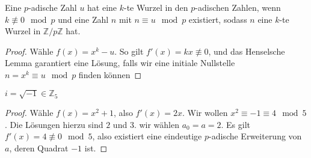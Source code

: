 \documentclass{report}
\newcommand{\bZ}{\mathbb{Z}}
\begin{document}
	\begin{application}
		Eine $p$-adische Zahl $u$ hat eine $k$-te Wurzel in den $p$-adischen Zahlen, wenn $k \not \equiv 0 \mod p$ und eine Zahl $n$ mit $n \equiv u \mod p$ existiert, sodass $n$ eine $k$-te Wurzel in $\bZ / p\bZ$ hat.
	\end{application}
	\begin{proof}
		Wähle $f(x) = x^k - u$. So gilt $f'(x) = kx \not \equiv 0$, und das Henselsche Lemma garantiert eine Lösung, falls wir eine initiale Nullstelle $n = x^k \equiv u \mod p$ finden können
	\end{proof}
	\begin{application}
		$i = \sqrt{-1} \in \bZ_5$
	\end{application}
	\begin{proof}
		Wähle $f(x) = x^2 + 1$, also $f'(x) = 2x$. Wir wollen $x^2 \equiv -1 \equiv 4 \mod 5$. Die Lösungen hierzu sind $2$ und $3$. wir wählen $a_0 = a = 2$. Es gilt $f'(x) = 4 \not\equiv 0 \mod 5$, also existiert eine eindeutige $p$-adische Erweiterung von $a$, deren Quadrat $-1$ ist.
	\end{proof}
	\iffalse
	\section{Eine verallgemeinerte Version}
	Unsere erste Version des Henselschen Lemmas erlaubt uns nicht, Wurzeln mit Vielfachheiten größer als $1$ als die initiale Approximation zu verwenden. Wir beweisen nun eine allgemeinere Version, welche uns außerdem eine Abschätzung des $p$-adischen Abstands zwischen der Approximation und der exakten Lösung gibt:
	\begin{theorem}
		Sei 
		\begin{align*}
			F(x) = \sum_{i = 0}^n c_i x^i
		\end{align*}
		ein Polynom mit Koeffizienten $c_i \in \bZ_p$. Sei $F'(x)$ die Ableitung von $F(x)$, also
		\begin{align*}
			F'(x) = \sum_{i = 0}^{n-1} c_{i+1} x^i
		\end{align*}
		Sei außerdem $a_0 \in \bZ_p$, sodass:
		\begin{align*}
			\abs{F(a_0)}_p < \abs{F'(a_0)}_p^2 
		\end{align*}
		Dann existiert ein eindeutiges $a \in \bZ_p$, sodass:
		\begin{align*}
				F(a) &= 0\\
				\abs{a - a_0}_p & = \abs{\frac{F(a_0)}{F'(a_0)}}_p < \abs{F'(a)}_p\\
				\abs{F'(a)}_p &= \abs{F'(a_0)}_p
		\end{align*}
	\end{theorem}
	\fi
	\appendix
\end{document}

